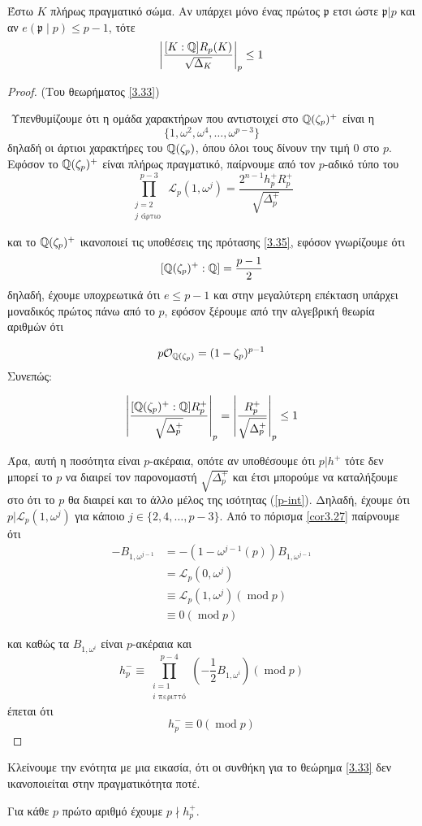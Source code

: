 \begin{prop}\label{3.35}
	Έστω $K$ πλήρως πραγματικό  σώμα. Αν υπάρχει μόνο ένας πρώτος $\mathfrak{p}$ ετσι ώστε $\mathfrak{p}|p$ και αν 
	$e(\mathfrak{p} \mid p)\leq p-1$, τότε
	$$\left|\frac{[K:\mathbb{Q}] R_p(K)}{\sqrt{\Delta_K}}\right|_p \leq 1$$
\end{prop}


\begin{proof} (Του θεωρήματος \ref{3.33})

	$ $\newline
	Υπενθυμίζουμε ότι η ομάδα χαρακτήρων που αντιστοιχεί στο $\mathbb{Q}(\zeta_p)^+$ είναι η $$\{1,\omega^2,\omega^4,\ldots,\omega^{p-3}\}$$
	δηλαδή οι άρτιοι χαρακτήρες του $\mathbb{Q}(\zeta_p)$, όπου όλοι τους δίνουν την τιμή $0$ στο $p$. Εφόσον το $\mathbb{Q}(\zeta_p)^+$ είναι πλήρως 
	πραγματικό, παίρνουμε από τον $p$-αδικό τύπο του 
	\begin{equation} \label{p-int}
		\prod\limits_{\substack{j=2 \\ j \text{ άρτιο }}}^{p-3} \mathcal{L}_p(1,\omega^j) = \frac{2^{n-1}h_p^+ R_p^+}{\sqrt{\Delta_p^+}}
	\end{equation}

	\noindent και το $\mathbb{Q}(\zeta_p)^+$ ικανοποιεί τις υποθέσεις της πρότασης \ref{3.35}, εφόσον γνωρίζουμε ότι
	$$[\mathbb{Q}(\zeta_p)^+:\mathbb{Q}] = \frac{p-1}2$$ δηλαδή, έχουμε υποχρεωτικά ότι $e \leq p-1$ και στην μεγαλύτερη επέκταση υπάρχει 
	μοναδικός πρώτος πάνω από το $p$, εφόσον ξέρουμε από την αλγεβρική θεωρία αριθμών ότι
	
	$$p\mathcal{O}_{\mathbb{Q}(\zeta_p)} = (1-\zeta_p)^{p-1}$$ Συνεπώς:

	$$\left| \frac{[\mathbb{Q}(\zeta_p)^+ :\mathbb{Q}]R_p^+}{\sqrt{\Delta^+_p}}\right|_p = \left|\frac{R_p^+}{\sqrt{\Delta^+_p}} \right|_p \leq 1$$

	\noindent Άρα, αυτή η ποσότητα είναι $p$-ακέραια, οπότε αν υποθέσουμε ότι $p |h^+$ τότε δεν μπορεί το $p$ να 
	διαιρεί τον παρονομαστή $\sqrt{\Delta^+_p}$ και έτσι μπορούμε να καταλήξουμε στο ότι το $p$ θα διαιρεί και το άλλο μέλος της 
	ισότητας (\ref{p-int}). Δηλαδή, έχουμε ότι $p|\mathcal{L}_p(1,\omega^{j})$ για κάποιο $j \in \{2,4,\ldots,p-3\}$. Από το 
	πόρισμα \ref{cor3.27} παίρνουμε ότι
	\begin{align*}
		-B_{1,\omega^{j-1}} &= -\left(1- \omega^{j-1}(p)\right)B_{1,\omega^{j-1}} \\
		&= \mathcal{L}_p(0,\omega^j) \\
		&\equiv \mathcal{L}_p(1,\omega^j)(\operatorname{mod}p) \\
		&\equiv 0(\operatorname{mod}p)
	\end{align*}

	\noindent και καθώς τα $B_{1,\omega^i}$ είναι $p$-ακέραια και 
	$$h^-_p \equiv \prod\limits_{\substack{i=1 \\ i \text{ περιττό}}}^{p-4} \left(-\frac12 B_{1,\omega^i}\right) 
	(\operatorname{mod}p)$$ έπεται ότι 
	$$h^-_p \equiv 0 (\operatorname{mod}p)$$
\end{proof}


	\noindent Κλείνουμε την ενότητα με μια εικασία, ότι οι συνθήκη για το θεώρημα \ref{3.33} δεν ικανοποιείται στην πραγματικότητα ποτέ.
	\begin{conj}[\tl{Vandiver}]
		Για κάθε $p$ πρώτο αριθμό έχουμε $p\nmid h^+_p$. 
	\end{conj}